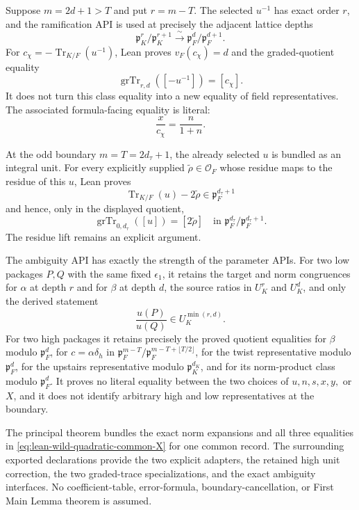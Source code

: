 \begin{theorem}
Suppose $m=2d+1>T$ and put $r=m-T$.  The selected $u^{-1}$ has exact
order $r$, and the ramification API is used at precisely the adjacent
lattice depths
\[
 \mathfrak p_K^r/\mathfrak p_K^{r+1}
   \xrightarrow{\ \sim\ }
 \mathfrak p_F^d/\mathfrak p_F^{d+1}.
\]
For $c_\chi=-\operatorname{Tr}_{K/F}(u^{-1})$, Lean proves
$v_F(c_\chi)=d$ and the graded-quotient equality
\[
 \operatorname{grTr}_{r,d}([-u^{-1}])=[c_\chi].
\]
It does not turn this class equality into a new equality of field
representatives.  The associated formula-facing equality is literal:
\[
 \frac{x}{c_\chi}=\frac{n}{1+n}.
\]

At the odd boundary $m=T=2d_\tau+1$, the already selected $u$ is bundled as
an integral unit.  For every explicitly supplied
$\widetilde\rho\in\mathcal O_F$ whose residue maps to the residue of this
$u$, Lean proves
\[
 \operatorname{Tr}_{K/F}(u)-2\widetilde\rho
   \in\mathfrak p_F^{d_\tau+1}
\]
and hence, only in the displayed quotient,
\[
 \operatorname{grTr}_{0,d_\tau}([u])=[2\widetilde\rho]
 \quad\text{in }\mathfrak p_F^{d_\tau}/\mathfrak p_F^{d_\tau+1}.
\]
The residue lift remains an explicit argument.

The ambiguity API has exactly the strength of the parameter APIs.  For two
low packages $P,Q$ with the same fixed $\epsilon_1$, it retains the target
and norm congruences for $\alpha$ at depth $r$ and for $\beta$ at depth $d$,
the source ratios in $U_K^r$ and $U_K^d$, and only the derived statement
\[
 \frac{u(P)}{u(Q)}\in U_K^{\min(r,d)}.
\]
For two high packages it retains precisely the proved quotient equalities
for $\beta$ modulo $\mathfrak p_F^d$, for
$c=\alpha\delta_h$ in
$\mathfrak p_F^{m-T}/\mathfrak p_F^{m-T+\lfloor T/2\rfloor}$, for the twist
representative modulo $\mathfrak p_F^d$, for the upstairs representative
modulo $\mathfrak p_K^{d_K}$, and for its norm-product class modulo
$\mathfrak p_F^d$.  It proves no literal equality between the two choices
of $u,n,s,x,y,$ or $X$, and it does not identify arbitrary high and low
representatives at the boundary.

The principal theorem bundles the exact norm expansions and all three
equalities in \eqref{eq:lean-wild-quadratic-common-X} for one common record.
The surrounding exported declarations provide the two explicit adapters,
the retained high unit correction, the two graded-trace specializations,
and the exact ambiguity interfaces.  No coefficient-table, error-formula,
boundary-cancellation, or First Main Lemma theorem is assumed.


\end{theorem}

